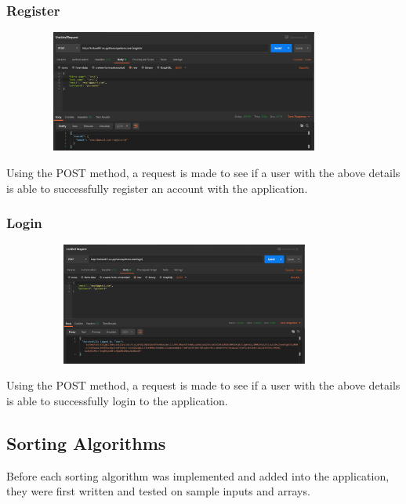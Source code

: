 \subsubsection{Register}
\begin{center}
    \includegraphics[width=12cm,height=4cm,keepaspectratio]{images/postman_register}
\end{center}
Using the POST method, a request is made to see if a user with the above details is able to successfully register an account with the application.

\subsubsection{Login}
\begin{center}
    \includegraphics[width=12cm,height=4cm,keepaspectratio]{images/postman_login}
\end{center}
Using the POST method, a request is made to see if a user with the above details is able to successfully login to the application.

\subsection{Sorting Algorithms}
Before each sorting algorithm was implemented and added into the application, they were first written and tested on sample inputs and arrays.


